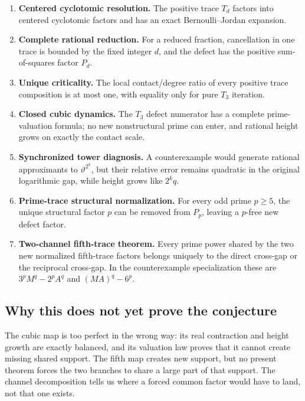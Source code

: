 \documentclass[11pt,oneside]{article}
\theoremstyle{definition}
\theoremstyle{remark}
\newcommand{\thetaAE}{\vartheta}
\begin{document}
\begin{enumerate}
\item \textbf{Centered cyclotomic resolution.}
The positive trace \(T_d\) factors into centered cyclotomic factors and has an exact
Bernoulli--Jordan expansion.

\item \textbf{Complete rational reduction.}
For a reduced fraction, cancellation in one trace is bounded by the fixed integer \(d\), and
the defect has the positive sum-of-squares factor \(P_d\).

\item \textbf{Unique criticality.}
The local contact/degree ratio of every positive trace composition is at most one, with equality
only for pure \(T_3\) iteration.

\item \textbf{Closed cubic dynamics.}
The \(T_3\) defect numerator has a complete prime-valuation formula; no new nonstructural prime
can enter, and rational height grows on exactly the contact scale.

\item \textbf{Synchronized tower diagnosis.}
A counterexample would generate rational approximants to \(\thetaAE^{2^k}\), but their
relative error remains quadratic in the original logarithmic gap, while height grows like
\(2^kq\).

\item \textbf{Prime-trace structural normalization.}
For every odd prime \(p\ge5\), the unique structural factor \(p\) can be removed from
\(P_p\), leaving a \(p\)-free new defect factor.

\item \textbf{Two-channel fifth-trace theorem.}
Every prime power shared by the two new normalized fifth-trace factors belongs uniquely to the
direct cross-gap or the reciprocal cross-gap.  In the counterexample specialization these are
\(3^pM^q-2^pA^q\) and \((MA)^q-6^p\).
\end{enumerate}

\subsection{Why this does not yet prove the conjecture}

The cubic map is too perfect in the wrong way: its real contraction and height growth are
exactly balanced, and its valuation law proves that it cannot create missing shared support.
The fifth map creates new support, but no present theorem forces the two branches to share a
large part of that support.  The channel decomposition tells us where a forced common factor
would have to land, not that one exists.
\end{document}
